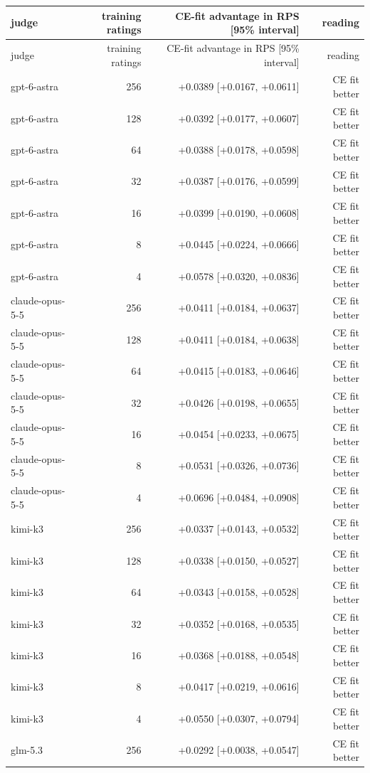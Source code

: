 \begin{longtable}{lrrr}
\toprule
judge & training ratings & CE-fit advantage in RPS [95\% interval] & reading \\
\midrule
\endfirsthead
\toprule
judge & training ratings & CE-fit advantage in RPS [95\% interval] & reading \\
\midrule
\endhead
gpt-6-astra & 256 & +0.0389 [+0.0167, +0.0611] & CE fit better \\
gpt-6-astra & 128 & +0.0392 [+0.0177, +0.0607] & CE fit better \\
gpt-6-astra & 64 & +0.0388 [+0.0178, +0.0598] & CE fit better \\
gpt-6-astra & 32 & +0.0387 [+0.0176, +0.0599] & CE fit better \\
gpt-6-astra & 16 & +0.0399 [+0.0190, +0.0608] & CE fit better \\
gpt-6-astra & 8 & +0.0445 [+0.0224, +0.0666] & CE fit better \\
gpt-6-astra & 4 & +0.0578 [+0.0320, +0.0836] & CE fit better \\
claude-opus-5-5 & 256 & +0.0411 [+0.0184, +0.0637] & CE fit better \\
claude-opus-5-5 & 128 & +0.0411 [+0.0184, +0.0638] & CE fit better \\
claude-opus-5-5 & 64 & +0.0415 [+0.0183, +0.0646] & CE fit better \\
claude-opus-5-5 & 32 & +0.0426 [+0.0198, +0.0655] & CE fit better \\
claude-opus-5-5 & 16 & +0.0454 [+0.0233, +0.0675] & CE fit better \\
claude-opus-5-5 & 8 & +0.0531 [+0.0326, +0.0736] & CE fit better \\
claude-opus-5-5 & 4 & +0.0696 [+0.0484, +0.0908] & CE fit better \\
kimi-k3 & 256 & +0.0337 [+0.0143, +0.0532] & CE fit better \\
kimi-k3 & 128 & +0.0338 [+0.0150, +0.0527] & CE fit better \\
kimi-k3 & 64 & +0.0343 [+0.0158, +0.0528] & CE fit better \\
kimi-k3 & 32 & +0.0352 [+0.0168, +0.0535] & CE fit better \\
kimi-k3 & 16 & +0.0368 [+0.0188, +0.0548] & CE fit better \\
kimi-k3 & 8 & +0.0417 [+0.0219, +0.0616] & CE fit better \\
kimi-k3 & 4 & +0.0550 [+0.0307, +0.0794] & CE fit better \\
glm-5.3 & 256 & +0.0292 [+0.0038, +0.0547] & CE fit better \\

\end{longtable}
